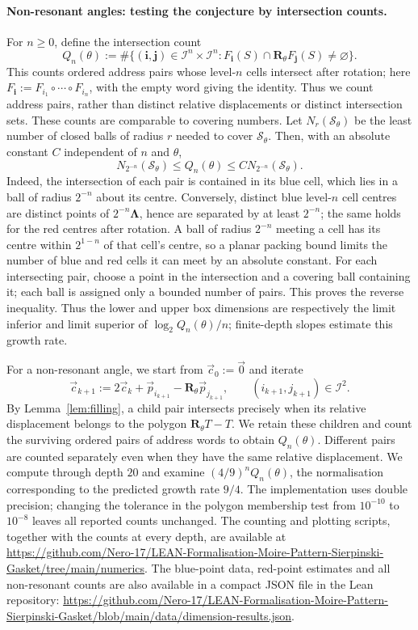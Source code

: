 \documentclass[scheme=plain]{ctexart}
\begin{document}
\paragraph{Non-resonant angles: testing the conjecture by intersection counts.}
For $n\ge0$, define the intersection count
\[
Q_n(\theta):=\#\bigl\{(\mathbf i,\mathbf j)\in\mathcal I^n\times\mathcal I^n:
F_{\mathbf i}(S)\cap\mathbf R_\theta F_{\mathbf j}(S)\neq\varnothing\bigr\}.
\]
This counts ordered address pairs whose level-$n$ cells intersect after rotation; here $F_{\mathbf i}:=F_{i_1}\circ\cdots\circ F_{i_n}$, with the empty word giving the identity.
Thus we count address pairs, rather than distinct relative displacements or distinct intersection sets.
These counts are comparable to covering numbers.
Let $N_r(\mathcal S_\theta)$ be the least number of closed balls of radius $r$ needed to cover $\mathcal S_\theta$.
Then, with an absolute constant $C$ independent of $n$ and $\theta$,
\[
N_{2^{-n}}(\mathcal S_\theta)\le Q_n(\theta)\le C N_{2^{-n}}(\mathcal S_\theta).
\]
Indeed, the intersection of each pair is contained in its blue cell, which lies in a ball of radius $2^{-n}$ about its centre.
Conversely, distinct blue level-$n$ cell centres are distinct points of $2^{-n}\boldsymbol\Lambda$, hence are separated by at least $2^{-n}$; the same holds for the red centres after rotation.
A ball of radius $2^{-n}$ meeting a cell has its centre within $2^{1-n}$ of that cell's centre, so a planar packing bound limits the number of blue and red cells it can meet by an absolute constant.
For each intersecting pair, choose a point in the intersection and a covering ball containing it; each ball is assigned only a bounded number of pairs.
This proves the reverse inequality.
Thus the lower and upper box dimensions are respectively the limit inferior and limit superior of $\log_2 Q_n(\theta)/n$; finite-depth slopes estimate this growth rate.

For a non-resonant angle, we start from $\vec c_0:=\vec{0}$ and iterate
\[
\vec c_{k+1}:=2\vec c_k+\vec p_{i_{k+1}}-\mathbf R_\theta\vec p_{j_{k+1}},
\qquad (i_{k+1},j_{k+1})\in\mathcal I^2.
\]
By Lemma~\ref{lem:filling}, a child pair intersects precisely when its relative displacement belongs to the polygon $\mathbf R_\theta T-T$.
We retain these children and count the surviving ordered pairs of address words to obtain $Q_n(\theta)$.
Different pairs are counted separately even when they have the same relative displacement.
We compute through depth $20$ and examine $(4/9)^nQ_n(\theta)$, the normalisation corresponding to the predicted growth rate $9/4$.
The implementation uses double precision; changing the tolerance in the polygon membership test from $10^{-10}$ to $10^{-8}$ leaves all reported counts unchanged.
The counting and plotting scripts, together with the counts at every depth, are available at \url{https://github.com/Nero-17/LEAN-Formalisation-Moire-Pattern-Sierpinski-Gasket/tree/main/numerics}.
The blue-point data, red-point estimates and all non-resonant counts are also available in a compact JSON file in the Lean repository: \url{https://github.com/Nero-17/LEAN-Formalisation-Moire-Pattern-Sierpinski-Gasket/blob/main/data/dimension-results.json}.
\end{document}
